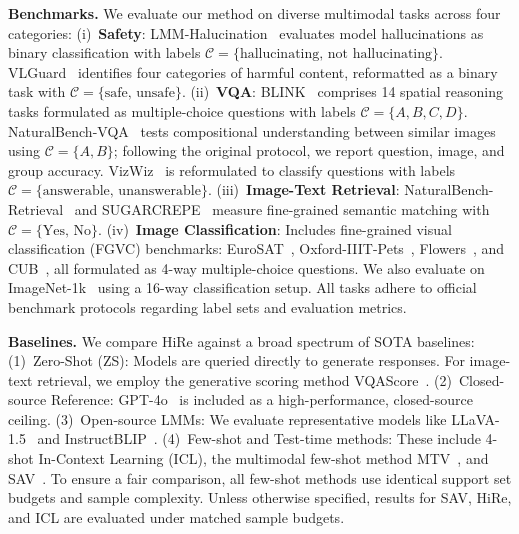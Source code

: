 \documentclass[sigconf,review,anonymous,9pt,table]{acmart}
\newcommand{\minisection}[1]{\smallskip\noindent\textbf{#1}}
\begin{document}
\minisection{Benchmarks.}
We evaluate our method on diverse multimodal tasks across four categories:
(i)~\textbf{Safety}: 
LMM-Halucination~\cite{chen2024unified} evaluates model hallucinations as binary classification with labels $\mathcal{C}=\{\text{hallucinating, not hallucinating}\}$. VLGuard~\cite{zong2024safety} identifies four categories of harmful content, reformatted as a binary task with $\mathcal{C}=\{\text{safe, unsafe}\}$. 
(ii)~\textbf{VQA}: 
BLINK~\cite{fu2024blink} comprises 14 spatial reasoning tasks formulated as multiple-choice questions with labels $\mathcal{C}=\{A, B, C, D\}$. NaturalBench-VQA~\cite{li2024naturalbench} tests compositional understanding between similar images using $\mathcal{C}=\{A, B\}$; following the original protocol, we report question, image, and group accuracy. VizWiz~\cite{gurari2018vizwiz} is reformulated to classify questions with labels $\mathcal{C}=\{\text{answerable, unanswerable}\}$.
(iii)~\textbf{Image-Text Retrieval}: 
NaturalBench-Retrieval~\cite{li2024naturalbench} and SUGARCREPE~\cite{hsieh2023sugarcrepe} measure fine-grained semantic matching with $\mathcal{C}=\{\text{Yes, No}\}$.
(iv)~\textbf{Image Classification}: 
Includes fine-grained visual classification (FGVC) benchmarks: EuroSAT~\cite{helber2019eurosat}, Oxford-IIIT-Pets~\cite{parkhi2012cats}, Flowers~\cite{nilsback2008automated}, and CUB~\cite{wah2011caltech}, all formulated as 4-way multiple-choice questions. We also evaluate on ImageNet-1k~\cite{deng2009imagenet} using a 16-way classification setup.
All tasks adhere to official benchmark protocols regarding label sets and evaluation metrics.

\minisection{Baselines.}
We compare HiRe against a broad spectrum of SOTA baselines:
(1)~Zero-Shot (ZS): Models are queried directly to generate responses. For image-text retrieval, we employ the generative scoring method VQAScore~\cite{lin2024evaluating}.
(2)~Closed-source Reference: GPT-4o~\cite{achiam2023gpt} is included as a high-performance, closed-source ceiling.
(3)~Open-source LMMs: We evaluate representative models like LLaVA-1.5~\cite{li2024llava} and InstructBLIP~\cite{dai2023instructblip}.
(4)~Few-shot and Test-time methods: These include 4-shot In-Context Learning (ICL), the multimodal few-shot method MTV~\cite{mitra2025enhancing}, and SAV~\cite{mitra2025enhancing}. 
To ensure a fair comparison, all few-shot methods use identical support set budgets and sample complexity. 
Unless otherwise specified, results for SAV, HiRe, and ICL are evaluated under matched sample budgets.
\end{document}
